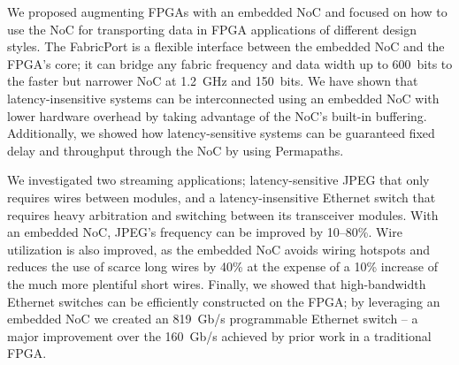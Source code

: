 %
%

We proposed augmenting FPGAs with an embedded NoC and focused on how to use the NoC for transporting data in FPGA applications of different design styles.
The FabricPort is a flexible interface between the embedded NoC and the FPGA's core; it can bridge any fabric frequency and data width up to 600~bits to the faster but narrower NoC at 1.2~GHz and 150~bits.
We have shown that latency-insensitive systems can be interconnected using an embedded NoC with lower hardware overhead by taking advantage of the NoC's built-in buffering.
Additionally, we showed how latency-sensitive systems can be guaranteed fixed delay and throughput through the NoC by using Permapaths.

We investigated two streaming applications; latency-sensitive JPEG that only requires wires between modules, and a latency-insensitive Ethernet switch that requires heavy arbitration and switching between its transceiver modules.
With an embedded NoC, JPEG's frequency can be improved by 10--80\%.
Wire utilization is also improved, as the embedded NoC avoids wiring hotspots and reduces the use of scarce long wires by 40\% at the expense of a 10\% increase of the much more plentiful short wires.
Finally, we showed that high-bandwidth Ethernet switches can be efficiently constructed on the FPGA; by leveraging an embedded NoC we created an 819~Gb/s programmable Ethernet switch -- a major improvement over the 160~Gb/s achieved by prior work in a traditional FPGA.

%
%
